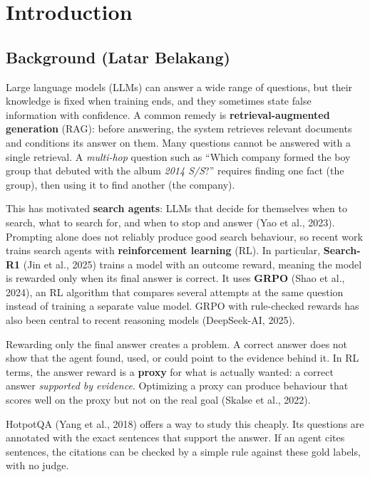 \chapter{Introduction}\label{sec:1}

\section{Background (Latar Belakang)}\label{sec:1.1}

Large language models (LLMs) can answer a wide range of questions, but
their knowledge is fixed when training ends, and they sometimes state
false information with confidence. A common remedy is
\textbf{retrieval-augmented generation} (RAG): before answering, the
system retrieves relevant documents and conditions its answer on them.
Many questions cannot be answered with a single retrieval. A
\emph{multi-hop} question such as ``Which company formed the boy group
that debuted with the album \emph{2014 S/S}?'' requires finding one fact
(the group), then using it to find another (the company).

This has motivated \textbf{search agents}: LLMs that decide for
themselves when to search, what to search for, and when to stop and
answer (Yao et al., 2023). Prompting alone does not reliably produce
good search behaviour, so recent work trains search agents with
\textbf{reinforcement learning} (RL). In particular, \textbf{Search-R1}
(Jin et al., 2025) trains a model with an outcome reward, meaning the
model is rewarded only when its final answer is correct. It uses
\textbf{GRPO} (Shao et al., 2024), an RL algorithm that compares several
attempts at the same question instead of training a separate value
model. GRPO with rule-checked rewards has also been central to recent
reasoning models (DeepSeek-AI, 2025).

Rewarding only the final answer creates a problem. A correct answer does
not show that the agent found, used, or could point to the evidence
behind it. In RL terms, the answer reward is a \textbf{proxy} for what
is actually wanted: a correct answer \emph{supported by evidence}.
Optimizing a proxy can produce behaviour that scores well on the proxy
but not on the real goal (Skalse et al., 2022).

HotpotQA (Yang et al., 2018) offers a way to study this cheaply. Its
questions are annotated with the exact sentences that support the
answer. If an agent cites sentences, the citations can be checked by a
simple rule against these gold labels, with no judge.

